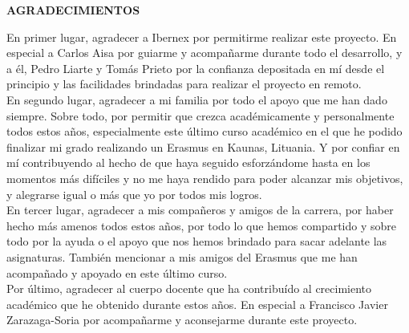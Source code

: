 \begin{center}
{\Large \bfseries AGRADECIMIENTOS}
\vspace{2.5cm}
\end{center}

En primer lugar, agradecer a Ibernex por permitirme realizar este proyecto. En especial a Carlos Aisa por guiarme y acompañarme durante todo el desarrollo, y a él, Pedro Liarte y Tomás Prieto por la confianza depositada en mí desde el principio y las facilidades brindadas para realizar el proyecto en remoto.\\

En segundo lugar, agradecer a mi familia por todo el apoyo que me han dado siempre. Sobre todo, por permitir que crezca académicamente y personalmente todos estos años, especialmente este último curso académico en el que he podido finalizar mi grado realizando un Erasmus en Kaunas, Lituania. Y por confiar en mí contribuyendo al hecho de que haya seguido esforzándome hasta en los momentos más difíciles y no me haya rendido para poder alcanzar mis objetivos, y alegrarse igual o más que yo por todos mis logros. \\

En tercer lugar, agradecer a mis compañeros y amigos de la carrera, por haber hecho más amenos todos estos años, por todo lo que hemos compartido y sobre todo por la ayuda o el apoyo que nos hemos brindado para sacar adelante las asignaturas. También mencionar a mis amigos del Erasmus que me han acompañado y apoyado en este último curso. \\

Por último, agradecer al cuerpo docente que ha contribuído al crecimiento académico que he obtenido durante estos años. En especial a Francisco Javier Zarazaga-Soria por acompañarme y aconsejarme durante este proyecto.